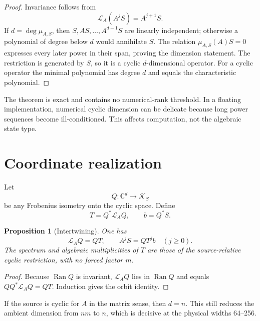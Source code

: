 \documentclass[12pt]{article}
\newtheorem{proposition}[theorem]{Proposition}
\theoremstyle{remark}
\newcommand{\cK}{\mathcal K}
\newcommand{\cL}{\mathcal L}
\begin{document}
\begin{proof}
Invariance follows from
\[
 \cL_A(A^jS)=A^{j+1}S.
\]
If
$d=\deg\mu_{A,S}$, then
$S,AS,\ldots,A^{d-1}S$ are linearly independent; otherwise a polynomial of
degree below $d$ would annihilate $S$.  The relation
$\mu_{A,S}(A)S=0$ expresses every later power in their span, proving the
dimension statement.  The restriction is generated by $S$, so it is a
cyclic $d$-dimensional operator.  For a cyclic operator the minimal
polynomial has degree $d$ and equals the characteristic polynomial.
\end{proof}

The theorem is exact and contains no numerical-rank threshold.  In a
floating implementation, numerical cyclic dimension can be delicate because
long power sequences become ill-conditioned.  This affects computation, not
the algebraic state type.

\section{Coordinate realization}

Let
\begin{equation}\label{eq:isometry}
 Q:\mathbb C^d\longrightarrow\cK_S
\end{equation}
be any Frobenius isometry onto the cyclic space.  Define
\begin{equation}\label{eq:reduced-data}
 T=Q^*\cL_AQ,
 \qquad b=Q^*S.
\end{equation}

\begin{proposition}[Intertwining]\label{prop:intertwining}
One has
\begin{equation}\label{eq:intertwining}
 \cL_AQ=QT,
 \qquad
 A^jS=QT^jb
 \quad(j\ge0).
\end{equation}
The spectrum and algebraic multiplicities of $T$ are those of the
source-relative cyclic restriction, with no forced factor $m$.
\end{proposition}

\begin{proof}
Because $\operatorname{Ran}Q$ is invariant, $\cL_AQ$ lies in
$\operatorname{Ran}Q$ and equals $QQ^*\cL_AQ=QT$.  Induction gives the orbit
identity.
\end{proof}

If the source is cyclic for $A$ in the matrix sense, then $d=n$.  This still
reduces the ambient dimension from $nm$ to $n$, which is decisive at the
physical widths 64--256.
\end{document}
